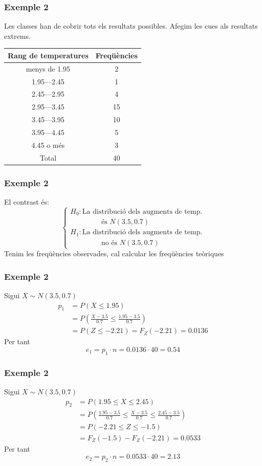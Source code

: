 \documentclass[12pt,t]{beamer}
\renewcommand{\leq}{\leqslant}
\theoremstyle{plain}
\theoremstyle{definition}
\begin{document}
\begin{frame}
\frametitle{Exemple 2}

Les classes han de cobrir tots els resultats possibles. Afegim les cues als resultats extrems.
\medskip

\begin{center}
\begin{tabular}{|c|c|}
\hline
Rang de temperatures & Freqüències
\\
\hline
menys de 1.95 & 2 \\
1.95---2.45 & 1 \\
2.45---2.95 & 4 \\
2.95---3.45 & 15 \\
3.45---3.95 & 10 \\
3.95---4.45 & 5 \\
4.45 o més & 3 \\
\hline
Total & 40\\  \hline
\end{tabular}
\end{center}
\end{frame}



\begin{frame}
\frametitle{Exemple 2}

El contrast és:
$$\left\{
\begin{array}{l}
H_{0}:\mbox{La distribució dels augments de temp.}\\
\qquad\qquad\mbox{ és $N(3.5,0.7)$}\\[1ex]
H_{1}: \mbox{La distribució dels augments de temp.}\\
\qquad\qquad\mbox{  no és $N(3.5,0.7)$}
\end{array}
\right.$$
Tenim les freqüències observades, cal calcular les freqüències teòriques
\end{frame}

\begin{frame}
\frametitle{Exemple 2}
Sigui $X\sim N(3.5,0.7)$
$$
\begin{array}{rl}
p_1& \displaystyle =P(X\leq 1.95)\\[2ex]
& \displaystyle =P\left(\frac{X-3.5}{0.7}\leq \frac{1.95-3.5}{0.7} \right)\\[2ex]
& = P(Z\leq  -2.21)=F_Z(-2.21)=0.0136
\end{array}
$$
Per tant
$$
e_1=p_1\cdot n= 0.0136\cdot 40=0.54
$$
\end{frame}

\begin{frame}
\frametitle{Exemple 2}
Sigui $X\sim N(3.5,0.7)$
$$
\begin{array}{rl}
p_2& \displaystyle =P(1.95\leq X\leq 2.45)\\[2ex]
& \displaystyle =P\left(\frac{1.95-3.5}{0.7}\leq\frac{X-3.5}{0.7}\leq \frac{2.45-3.5}{0.7} \right)\\[2ex]
& = P(-2.21 \leq Z\leq  -1.5)\\[2ex]
 & =F_Z(-1.5)-F_Z(-2.21)=0.0533
\end{array}
$$
Per tant
$$
e_2=p_2\cdot n= 0.0533\cdot 40= 2.13
$$
\end{frame}
\end{document}
